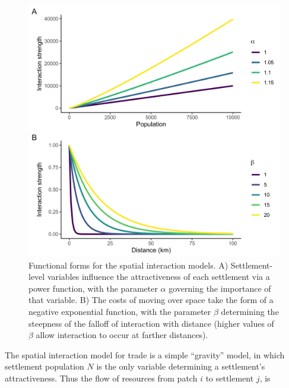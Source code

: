 \documentclass{article}
\begin{document}
\begin{figure}
    \centering
    \includegraphics[width=\columnwidth]{images/functions.png}
    \caption[Functional forms for the spatial interaction models]{Functional forms for the spatial interaction models. A) Settlement-level variables influence the attractiveness of each settlement via a power function, with the parameter $\alpha$ governing the importance of that variable. B) The costs of moving over space take the form of a negative exponential function, with the parameter $\beta$ determining the steepness of the falloff of interaction with distance (higher values of $\beta$ allow interaction to occur at farther distances).}
    \label{fig:functions}
\end{figure}

The spatial interaction model for trade is a simple ``gravity'' model, in which settlement population $N$ is the only variable determining a settlement's attractiveness. Thus the flow of resources from patch $i$ to settlement $j$, is
\end{document}
